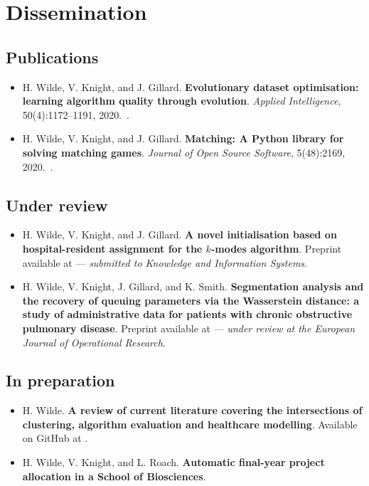 \chapter*{Dissemination}\label{dissemination}

\section*{Publications}

\begin{itemize}
    \item H. Wilde, V. Knight, and J. Gillard. \textbf{Evolutionary dataset
        optimisation: learning algorithm quality through evolution}.
        \emph{Applied Intelligence}, 50(4):1172–1191,
        2020.~.
    \item H. Wilde, V. Knight, and J. Gillard. \textbf{Matching: A Python
        library for solving matching games}. \emph{Journal of Open Source
    Software}, 5(48):2169, 2020.~.
\end{itemize}

\section*{Under review}

\begin{itemize}
    \item H. Wilde, V. Knight, and J. Gillard. \textbf{A novel initialisation
        based on hospital-resident assignment for the \(k\)-modes algorithm}.
        Preprint available at  --- \emph{submitted to
        Knowledge and Information Systems}.
    \item H. Wilde, V. Knight, J. Gillard, and K. Smith. \textbf{Segmentation
        analysis and the recovery of queuing parameters via the Wasserstein
        distance: a study of administrative data for patients with chronic
        obstructive pulmonary disease}. Preprint available at 
        --- \emph{under review at the European Journal of Operational Research}.
\end{itemize}

\section*{In preparation}

\begin{itemize}
    \item H. Wilde. \textbf{A review of current literature covering the
        intersections of clustering, algorithm evaluation and healthcare
        modelling}. Available on GitHub at
        .
    \item H. Wilde, V. Knight, and L. Roach. \textbf{Automatic final-year
        project allocation in a School of Biosciences}.
\end{itemize}

